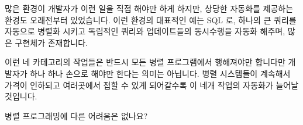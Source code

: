 많은 환경이 개발자가 이런 일을 직접 해야만 하게 하지만, 상당한 자동화를
제공하는 환경도 오래전부터 있었습니다.
이런 환경의 대표적인 예는 SQL 로, 하나의 큰 쿼리를 자동으로 병렬화 시키고
독립적인 쿼리와 업데이트들의 동시수행을 자동화 해주며, 많은 구현체가
존재합니다.

이런 네 카테고리의 작업들은 반드시 모든 병렬 프로그램에서 행해져야만 합니다만
개발자가 하나 하나 손으로 해야만 한다는 의미는 아닙니다.
병렬 시스템들이 계속해서 가격이 인하되고 여러곳에서 접할 수 있게 되어갈수록 이
네개 작업의 자동화가 늘어날 것입니다.

\QuickQuiz{}
	병렬 프로그래밍에 다른 어려움은 없나요?

